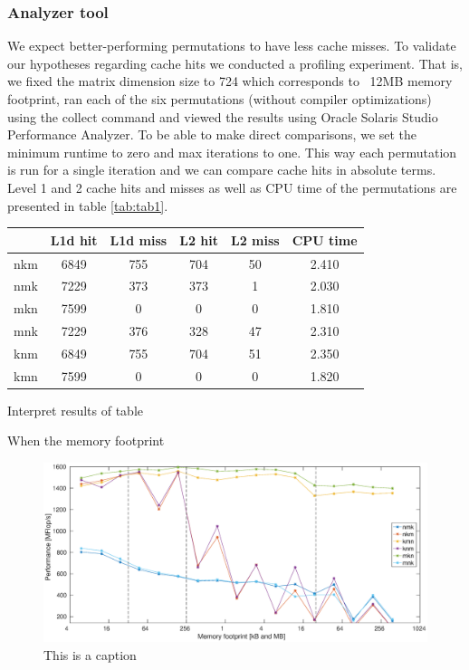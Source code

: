 \subsubsection{Analyzer tool}
We expect better-performing permutations to have less cache misses.   To validate our hypotheses regarding cache hits we conducted a profiling experiment. That is, we fixed the matrix dimension size to 724 which corresponds to ~12MB memory footprint, ran each of the six permutations (without compiler optimizations) using the collect command and viewed the results using Oracle Solaris Studio Performance Analyzer. To be able to make direct comparisons, we set the minimum runtime to zero and max iterations to one. This way each permutation is run for a single iteration and we can compare cache hits in absolute terms. \\
Level 1 and 2 cache hits and misses as well as CPU time of the permutations are presented in table \ref{tab:tab1}.
\begin{center}
 \label{tab:tab1} 
\begin{tabular}{ |c|c|c|c|c|c| } 
\hline
 & L1d hit & L1d miss & L2 hit & L2 miss & CPU time \\ 
\hline
nkm & 6849 & 755 & 704 & 50 & 2.410 \\  
\hline
nmk & 7229 & 373 & 373 & 1 & 2.030 \\ 
\hline
mkn & 7599 & 0 & 0 & 0 & 1.810 \\ 
\hline
mnk & 7229 & 376 & 328 & 47 & 2.310 \\ 
\hline
knm & 6849 & 755 & 704 & 51 & 2.350 \\ 
\hline
kmn & 7599 & 0 & 0 & 0 & 1.820 \\ 
\hline
\end{tabular}
\end{center}

Interpret results of table


When the memory footprint 

\begin{figure}
\centering
\includegraphics[width = 1.1\textwidth]{fig/permGraph_fast.eps}
\caption{This is a caption}
\label{fig:comp1}
\end{figure}

